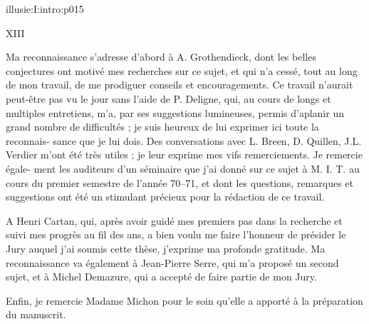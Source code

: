 \IllusieSetPhysicalPageSize{450.6bp}{704bp}
\begin{illusiefrontpage}{illusie:I:intro:p015}{}
\begin{center}\fontsize{10}{12}\selectfont XIII\end{center}
\vspace{12bp}
\hypertarget{illusie:I:intro:p015:p1}{}%
\hspace*{22bp}Ma reconnaissance s'adresse d'abord à A. Grothendieck, dont les belles
conjectures ont motivé mes recherches sur ce sujet, et qui n'a cessé, tout au long
de mon travail, de me prodiguer conseils et encouragements. Ce travail n'aurait
peut-être pas vu le jour sans l'aide de P. Deligne, qui, au cours de longs et
multiples entretiens, m'a, par ses suggestions lumineuses, permis d'aplanir un
grand nombre de difficultés ; je suis heureux de lui exprimer ici toute la
reconnais-\linebreak
sance que je lui dois. Des conversations avec L. Breen, D. Quillen, J.L. Verdier
m'ont été très utiles ; je leur exprime mes vifs remerciements. Je remercie égale-\linebreak
ment les auditeurs d'un séminaire que j'ai donné sur ce sujet à M. I. T. au cours
du premier semestre de l'année 70--71, et dont les questions, remarques et
suggestions ont été un stimulant précieux pour la rédaction de ce travail.

\vspace{8bp}
\hypertarget{illusie:I:intro:p015:p2}{}%
\hspace*{22bp}A Henri Cartan, qui, après avoir guidé mes premiers pas dans la recherche
et suivi mes progrès au fil des ans, a bien voulu me faire l'honneur de présider
le Jury auquel j'ai soumis cette thèse, j'exprime ma profonde gratitude. Ma
reconnaissance va également à Jean-Pierre Serre, qui m'a proposé un second sujet,
et à Michel Demazure, qui a accepté de faire partie de mon Jury.

\vspace{8bp}
\hypertarget{illusie:I:intro:p015:p3}{}%
\hspace*{22bp}Enfin, je remercie Madame Michon pour le soin qu'elle a apporté à la
préparation du manuscrit.
\end{illusiefrontpage}
